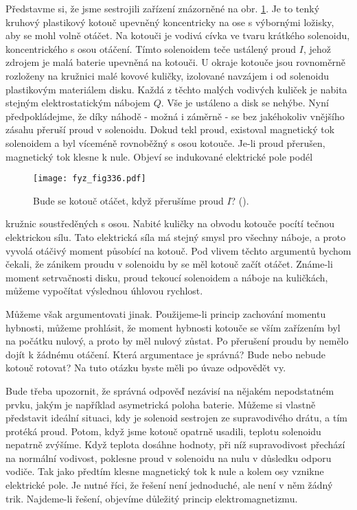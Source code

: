 {  Představme si, že jsme sestrojili zařízení znázorněné na obr. \ref{fyz:fig336}. Je to tenký 
  kruhový plastikový kotouč upevněný koncentricky na ose s výbornými ložisky, aby se mohl volně 
  otáčet. Na kotouči je vodivá cívka ve tvaru krátkého solenoidu, koncentrického s osou otáčení. 
  Tímto solenoidem teče ustálený proud \(I\), jehož zdrojem je malá baterie upevněná na kotouči. U 
  okraje kotouče jsou rovnoměrně rozloženy na kružnici malé kovové kuličky, izolované navzájem i od 
  solenoidu plastikovým materiálem disku. Každá z těchto malých vodivých kuliček je nabita stejným 
  elektrostatickým nábojem \(Q\). Vše je ustáleno a disk se nehýbe. Nyní předpokládejme, že díky 
  náhodě - možná i záměrně - se bez jakéhokoliv vnějšího zásahu přeruší proud v solenoidu. Dokud 
  tekl proud, existoval magnetický tok solenoidem a byl víceméně rovnoběžný s osou kotouče. Je-li 
  proud přerušen, magnetický tok klesne k nule. Objeví se indukované elektrické pole podél
  \begin{figure}[ht!]  %
    \centering
    \texttt{[image: fyz\_fig336.pdf]}
    \caption{Bude se kotouč otáčet, když přerušíme proud \(I\)?
             (\cite[s.~300]{Feynman02}).}
    \label{fyz:fig336}
  \end{figure}
  kružnic soustředěných s osou. Nabité kuličky na obvodu kotouče pocítí tečnou elektrickou sílu. 
  Tato elektrická síla má stejný smysl pro všechny náboje, a proto vyvolá otáčivý moment působící 
  na kotouč. Pod vlivem těchto argumentů bychom čekali, že zánikem proudu v solenoidu by se měl 
  kotouč začít otáčet. Známe-li moment setrvačnosti disku, proud tekoucí solenoidem a náboje
  na kuličkách, můžeme vypočítat výslednou úhlovou rychlost.
  
  Můžeme však argumentovati jinak. Použijeme-li princip zachování momentu hybnosti, můžeme 
  prohlásit, že moment hybnosti kotouče se vším zařízením byl na počátku nulový, a proto by měl 
  nulový zůstat. Po přerušení proudu by nemělo dojít k žádnému otáčení. Která argumentace je 
  správná? Bude nebo nebude kotouč rotovat? Na tuto otázku byste měli po úvaze odpovědět vy.
  
  Bude třeba upozornit, že správná odpověď nezávisí na nějakém nepodstatném prvku, jakým je 
  například asymetrická poloha baterie. Můžeme si vlastně představit ideální situaci, kdy je 
  solenoid sestrojen ze supravodivého drátu, a tím protéká proud. Potom, když jsme kotouč opatrně 
  usadili, teplotu solenoidu nepatrně zvýšíme. Když teplota dosáhne hodnoty, při níž supravodivost 
  přechází na normální vodivost, poklesne proud v solenoidu na nulu v důsledku odporu vodiče. Tak 
  jako předtím klesne magnetický tok k nule a kolem osy vznikne elektrické pole. Je nutné říci, že 
  řešení není jednoduché, ale není v něm žádný trik. Najdeme-li řešení, objevíme důležitý princip 
  elektromagnetizmu.
  
}
